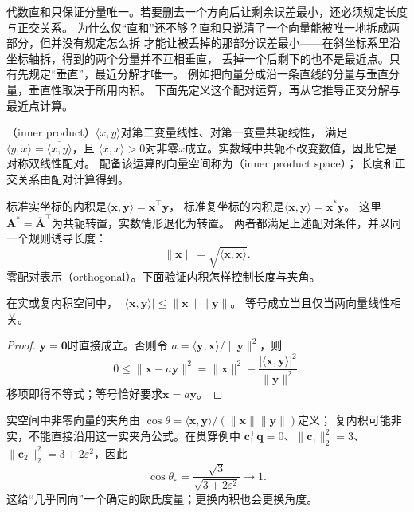 代数直和只保证分量唯一。若要删去一个方向后让剩余误差最小，还必须规定长度与正交关系。
为什么仅“直和”还不够？直和只说清了一个向量能被唯一地拆成两部分，但并没有规定怎么拆
才能让被丢掉的那部分误差最小——在斜坐标系里沿坐标轴拆，得到的两个分量并不互相垂直，
丢掉一个后剩下的也不是最近点。只有先规定“垂直”，最近分解才唯一。
例如把向量分成沿一条直线的分量与垂直分量，垂直性取决于所用内积。
下面先定义这个配对运算，再从它推导正交分解与最近点计算。
\begin{definition}[实与复内积]
\label{def:linear-algebra-inner-product}
\label{def:functional-inner-product-space}
（inner product）$\langle x,y\rangle$对第二变量线性、对第一变量共轭线性，
满足$\langle y,x\rangle=\overline{\langle x,y\rangle}$，且
$\langle x,x\rangle>0$对非零$x$成立。实数域中共轭不改变数值，因此它是对称双线性配对。
配备该运算的向量空间称为（inner product space）；
长度和正交关系由配对计算得到。
\end{definition}
标准实坐标的内积是$\langle\bm x,\bm y\rangle=\bm x^\top\bm y$，
标准复坐标的内积是$\langle\bm x,\bm y\rangle=\bm x^*\bm y$。
这里$\bm A^*=\overline{\bm A}^{\top}$为共轭转置，实数情形退化为转置。
两者都满足上述配对条件，并以同一个规则诱导长度：
\begin{equation}
 \lVert\bm x\rVert=\sqrt{\langle\bm x,\bm x\rangle}.
 \label{eq:linear-algebra-inner-product-norm}
\end{equation}
零配对表示（orthogonal）。下面验证内积怎样控制长度与夹角。

\begin{theorem}
\label{thm:linear-algebra-cauchy-schwarz}
在实或复内积空间中，
$|\langle\bm x,\bm y\rangle|\leq\lVert\bm x\rVert\lVert\bm y\rVert$。
等号成立当且仅当两向量线性相关。
\end{theorem}
\begin{proof}
$\bm y=\bm0$时直接成立。否则令
$a=\langle\bm y,\bm x\rangle/\lVert\bm y\rVert^2$，则
\[
 0\leq\lVert\bm x-a\bm y\rVert^2
 =\lVert\bm x\rVert^2-
   \frac{|\langle\bm x,\bm y\rangle|^2}{\lVert\bm y\rVert^2}.
\]
移项即得不等式；等号恰好要求$\bm x=a\bm y$。
\end{proof}

实空间中非零向量的夹角由
$\cos\theta=\langle\bm x,\bm y\rangle/(\lVert\bm x\rVert\lVert\bm y\rVert)$定义；
复内积可能非实，不能直接沿用这一实夹角公式。在贯穿例中
$\bm c_1^\top\bm q=0$、$\lVert\bm c_1\rVert_2^2=3$、
$\lVert\bm c_2\rVert_2^2=3+2\varepsilon^2$，因此
\begin{equation}
 \cos\theta_\varepsilon=\frac{\sqrt3}{\sqrt{3+2\varepsilon^2}}\longrightarrow1.
 \label{eq:linear-algebra-nearly-collinear-angle}
\end{equation}
这给“几乎同向”一个确定的欧氏度量；更换内积也会更换角度。


